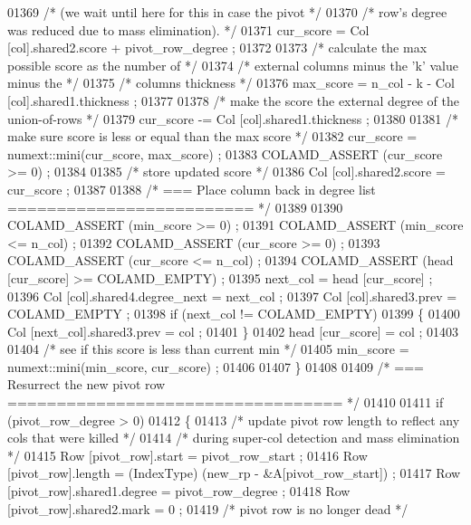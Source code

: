 \begin{DoxyCode}
{{{{{{{{{{{{{{{{{{{{{{{{{{{{01369       \textcolor{comment}{/* (we wait until here for this in case the pivot */}
01370       \textcolor{comment}{/* row's degree was reduced due to mass elimination). */}
01371       cur\_score = Col [col].shared2.score + pivot\_row\_degree ;
01372 
01373       \textcolor{comment}{/* calculate the max possible score as the number of */}
01374       \textcolor{comment}{/* external columns minus the 'k' value minus the */}
01375       \textcolor{comment}{/* columns thickness */}
01376       max\_score = n\_col - k - Col [col].shared1.thickness ;
01377 
01378       \textcolor{comment}{/* make the score the external degree of the union-of-rows */}
01379       cur\_score -= Col [col].shared1.thickness ;
01380 
01381       \textcolor{comment}{/* make sure score is less or equal than the max score */}
01382       cur\_score = numext::mini(cur\_score, max\_score) ;
01383       COLAMD\_ASSERT (cur\_score >= 0) ;
01384 
01385       \textcolor{comment}{/* store updated score */}
01386       Col [col].shared2.score = cur\_score ;
01387 
01388       \textcolor{comment}{/* === Place column back in degree list ========================= */}
01389 
01390       COLAMD\_ASSERT (min\_score >= 0) ;
01391       COLAMD\_ASSERT (min\_score <= n\_col) ;
01392       COLAMD\_ASSERT (cur\_score >= 0) ;
01393       COLAMD\_ASSERT (cur\_score <= n\_col) ;
01394       COLAMD\_ASSERT (head [cur\_score] >= COLAMD\_EMPTY) ;
01395       next\_col = head [cur\_score] ;
01396       Col [col].shared4.degree\_next = next\_col ;
01397       Col [col].shared3.prev = COLAMD\_EMPTY ;
01398       \textcolor{keywordflow}{if} (next\_col != COLAMD\_EMPTY)
01399       \{
01400     Col [next\_col].shared3.prev = col ;
01401       \}
01402       head [cur\_score] = col ;
01403 
01404       \textcolor{comment}{/* see if this score is less than current min */}
01405       min\_score = numext::mini(min\_score, cur\_score) ;
01406 
01407     \}
01408 
01409     \textcolor{comment}{/* === Resurrect the new pivot row ================================== */}
01410 
01411     \textcolor{keywordflow}{if} (pivot\_row\_degree > 0)
01412     \{
01413       \textcolor{comment}{/* update pivot row length to reflect any cols that were killed */}
01414       \textcolor{comment}{/* during super-col detection and mass elimination */}
01415       Row [pivot\_row].start  = pivot\_row\_start ;
01416       Row [pivot\_row].length = (IndexType) (new\_rp - &A[pivot\_row\_start]) ;
01417       Row [pivot\_row].shared1.degree = pivot\_row\_degree ;
01418       Row [pivot\_row].shared2.mark = 0 ;
01419       \textcolor{comment}{/* pivot row is no longer dead */}
}}}}}}}}}}}}}}}}}}}}}}}}}}}}
\end{DoxyCode}
